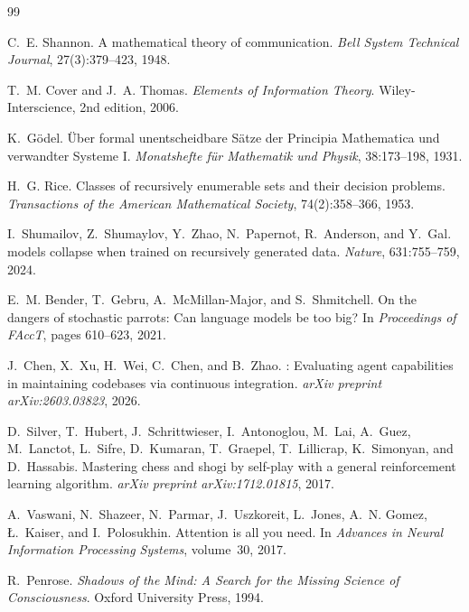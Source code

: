 \documentclass[11pt,a4paper]{article}
\begin{document}
\begin{thebibliography}{99}

C.~E. Shannon.
\newblock A mathematical theory of communication.
\newblock \emph{Bell System Technical Journal}, 27(3):379--423, 1948.

T.~M. Cover and J.~A. Thomas.
\newblock \emph{Elements of Information Theory}.
\newblock Wiley-Interscience, 2nd edition, 2006.

K.~G\"{o}del.
\newblock \"{U}ber formal unentscheidbare {S}\"{a}tze der {P}rincipia {M}athematica und verwandter {S}ysteme {I}.
\newblock \emph{Monatshefte f\"{u}r Mathematik und Physik}, 38:173--198, 1931.

H.~G. Rice.
\newblock Classes of recursively enumerable sets and their decision problems.
\newblock \emph{Transactions of the American Mathematical Society}, 74(2):358--366, 1953.

I.~Shumailov, Z.~Shumaylov, Y.~Zhao, N.~Papernot, R.~Anderson, and Y.~Gal.
 models collapse when trained on recursively generated data.
\newblock \emph{Nature}, 631:755--759, 2024.

E.~M. Bender, T.~Gebru, A.~McMillan-Major, and S.~Shmitchell.
\newblock On the dangers of stochastic parrots: Can language models be too big?
\newblock In \emph{Proceedings of FAccT}, pages 610--623, 2021.

J.~Chen, X.~Xu, H.~Wei, C.~Chen, and B.~Zhao.
: Evaluating agent capabilities in maintaining codebases via continuous integration.
\newblock \emph{arXiv preprint arXiv:2603.03823}, 2026.

D.~Silver, T.~Hubert, J.~Schrittwieser, I.~Antonoglou, M.~Lai, A.~Guez, M.~Lanctot, L.~Sifre, D.~Kumaran, T.~Graepel, T.~Lillicrap, K.~Simonyan, and D.~Hassabis.
\newblock Mastering chess and shogi by self-play with a general reinforcement learning algorithm.
\newblock \emph{arXiv preprint arXiv:1712.01815}, 2017.

A.~Vaswani, N.~Shazeer, N.~Parmar, J.~Uszkoreit, L.~Jones, A.~N. Gomez, \L.~Kaiser, and I.~Polosukhin.
\newblock Attention is all you need.
\newblock In \emph{Advances in Neural Information Processing Systems}, volume~30, 2017.

R.~Penrose.
\newblock \emph{Shadows of the Mind: A Search for the Missing Science of Consciousness}.
\newblock Oxford University Press, 1994.


\end{thebibliography}
\end{document}
